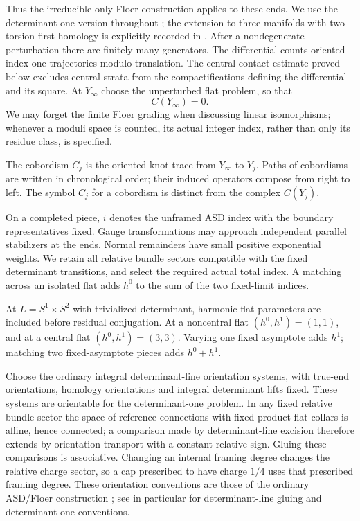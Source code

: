 Thus the irreducible-only Floer construction applies to these ends.
We use the determinant-one version throughout
\cite[Section~7.1, arXiv version~2]{KronheimerMrowka2010}; the extension to
three-manifolds with two-torsion first homology is explicitly recorded
in \cite[Section~2, Theorem~2.3]{GhoshSivekZentner2023}.  After a nondegenerate
perturbation there are finitely many generators.  The differential
counts oriented index-one trajectories modulo translation.  The
central-contact estimate proved below excludes central strata from
the compactifications defining the differential and its square.
At $Y_\infty$ choose the unperturbed flat problem, so that
\begin{equation}\label{eq:ordinary:sphere-complex}
 C(Y_\infty)=0.
\end{equation}
We may forget the finite Floer grading when discussing linear
isomorphisms; whenever a moduli space is counted, its actual integer
index, rather than only its residue class, is specified.

\begin{convention}
\label{conv:ordinary:index}
The cobordism $C_j$ is the oriented knot trace from $Y_\infty$ to $Y_j$.
Paths of cobordisms are written in chronological order; their induced
operators compose from right to left.  The symbol $C_j$ for a
cobordism is distinct from the complex $C(Y_j)$.

On a completed piece, $i$ denotes the unframed ASD index with the
boundary representatives fixed.  Gauge transformations may approach
independent parallel stabilizers at the ends.  Normal remainders have
small positive exponential weights.  We retain all relative bundle
sectors compatible with the fixed determinant transitions, and select
the required actual total index.  A matching across an isolated flat
adds $h^0$ to the sum of the two fixed-limit indices.

At $L=S^1\times S^2$ with trivialized determinant, harmonic flat
parameters are included before residual conjugation.  At a
noncentral flat $(h^0,h^1)=(1,1)$, and at a central flat
$(h^0,h^1)=(3,3)$.  Varying one fixed asymptote adds $h^1$; matching two
fixed-asymptote pieces adds $h^0+h^1$.

Choose the ordinary integral determinant-line orientation systems,
with true-end orientations, homology orientations and integral
determinant lifts fixed.  These systems are orientable for the
determinant-one problem.  In any fixed relative bundle sector the
space of reference connections with fixed product-flat collars is
affine, hence connected; a comparison made by determinant-line
excision therefore extends by orientation transport with a constant
relative sign.  Gluing these comparisons is associative.  Changing
an internal framing degree changes the relative charge sector, so
a cap prescribed to have charge $1/4$ uses that prescribed framing
degree.  These orientation conventions are those of the ordinary
ASD/Floer construction \cite{DonaldsonKronheimer1990}; see in particular
\cite[Section~5.4, Proposition~5.11, and Section~5.6]{Donaldson2002}
for determinant-line gluing and determinant-one conventions.
\end{convention}

